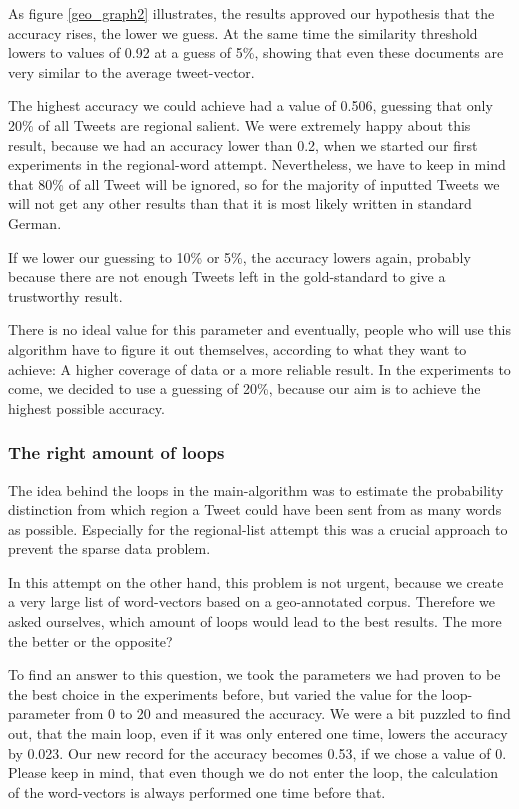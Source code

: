 \documentclass[./Main.tex]{subfiles}
\begin{document}
As figure \ref{geo_graph2} illustrates, the results approved our hypothesis that the accuracy rises, the lower we guess. At the same time the similarity threshold lowers to values of 0.92 at a guess of 5\%, showing that even these documents are very similar to the average tweet-vector.

The highest accuracy we could achieve had a value of 0.506, guessing that only 20\% of all Tweets are regional salient. We were extremely happy about this result, because we had an accuracy lower than 0.2, when we started our first experiments in the regional-word attempt. Nevertheless, we have to keep in mind that 80\% of all Tweet will be ignored, so for the majority of inputted Tweets we will not get any other results than that it is most likely written in standard German.

If we lower our guessing to 10\% or 5\%, the accuracy lowers again, probably because there are not enough Tweets left in the gold-standard to give a trustworthy result.

There is no ideal value for this parameter and eventually, people who will use this algorithm have to figure it out themselves, according to what they want to achieve: A higher coverage of data or a more reliable result. In the experiments to come, we decided to use a guessing of 20\%, because our aim is to achieve the highest possible accuracy.

\subsubsection{The right amount of loops}


The idea behind the loops in the main-algorithm was to estimate the probability distinction from which region a Tweet could have been sent from as many words as possible. Especially for the regional-list attempt this was a crucial approach to prevent the sparse data problem.

In this attempt on the other hand, this problem is not urgent, because we create a very large list of word-vectors based on a geo-annotated corpus. Therefore we asked ourselves, which amount of loops would lead to the best results. The more the better or the opposite? 

To find an answer to this question, we took the parameters we had proven to be the best choice in the experiments before, but varied the value for the loop-parameter from 0 to 20 and measured the accuracy. 
We were a bit puzzled to find out, that the main loop, even if it was only entered one time, lowers the accuracy by 0.023. Our new record for the accuracy becomes 0.53, if we chose a value of 0. Please keep in mind, that even though we do not enter the loop, the calculation of the word-vectors is always performed one time before that.
\end{document}
